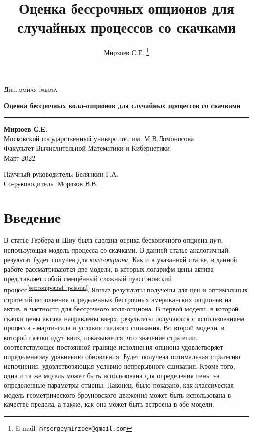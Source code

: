\documentclass[a4paper,12pt]{article}
\author{Мирзоев С.Е.%
\thanks{E-mail: \texttt{mrsergeymirzoev@gmail.com}}}
\title{Оценка бессрочных опционов для случайных процессов со скачками}
\affil{Факультет Вычислительной Математики и Кибернетики, Московский государственный университет им. М.В.Ломоносова}
\theoremstyle{definition}
\begin{document}
\begin{titlepage}
\centering

\textsc{Дипломная работа}


{\LARGE\bfseries Оценка бессрочных колл-опционов для случайных процессов со скачками\\}
\rule{3in}{0.4pt}


\textbf{Мирзоев С.Е.}\\
Московский государственный университет им. М.В.Ломоносова\\
Факультет Вычислительной Математики и Кибернетики\\
Март 2022


{\small
Научный руководитель: Белянкин Г.А.\\
Со-руководитель: Морозов В.В.}


\end{titlepage}
\thispagestyle{empty}

\newpage
\tableofcontents

\newpage

\section{Введение}

В статье Гербера и Шиу \cite{bib:GerberShiu} была сделана оценка бесконечного опциона \textit{пут}, использующая модель процесса со скачками. В данной статье аналогичный результат будет получен для \textit{колл-опциона}. Как и в указанной статье, в данной работе рассматриваются две модели, в которых логарифм цены актива представляет собой смещённый сложный пуассоновский процесс\textsuperscript{\ref{sec:compound_poisson}}. Явные результаты получены для цен и оптимальных стратегий исполнения определенных бессрочных американских опционов на актив, в частности для бессрочного колл-опциона. В первой модели, в которой скачки цены актива направлены вверх, результаты получаются с использованием процесса - мартингала и условия гладкого сшивания. Во второй модели, в которой скачки идут вниз, показывается, что значение стратегии, соответствующее постоянной границе исполнения опциона удовлетворяет определенному уравнению обновления. Будет получена оптимальная стратегию исполнения, удовлетворяющая условию непрерывного сшивания. Кроме того, одна и та же модель может быть использована для определения цены на определенные параметры отмены. Наконец, было показано, как классическая модель геометрического броуновского движения может быть использована в качестве предела, а также, как она может быть встроена в обе модели.
\end{document}
